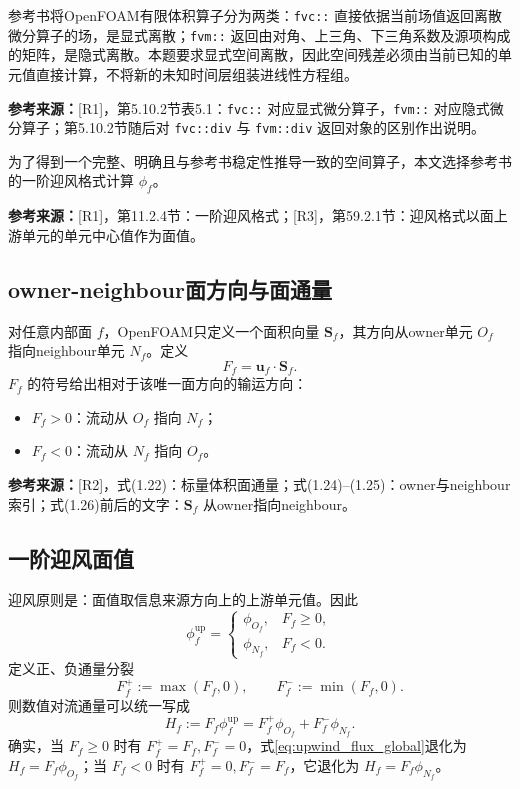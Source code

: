 \documentclass[UTF8,12pt,a4paper]{ctexart}
\numberwithin{equation}{section}
\newcommand{\Rone}{\textnormal{[R1]}}
\newcommand{\Rtwo}{\textnormal{[R2]}}
\newcommand{\Rthree}{\textnormal{[R3]}}
\newcommand{\source}[1]{%
  \par\smallskip
  \noindent\colorbox{sourcebg}{%
    \parbox{0.955\linewidth}{\footnotesize\color{sourcegray}\textbf{参考来源：}#1}%
  }
  \par\smallskip
}
\begin{document}
参考书将OpenFOAM有限体积算子分为两类：\texttt{fvc::} 直接依据当前场值返回离散微分算子的场，是显式离散；\texttt{fvm::} 返回由对角、上三角、下三角系数及源项构成的矩阵，是隐式离散。本题要求显式空间离散，因此空间残差必须由当前已知的单元值直接计算，不将新的未知时间层组装进线性方程组。

\source{\Rone，第5.10.2节表5.1：\texttt{fvc::} 对应显式微分算子，\texttt{fvm::} 对应隐式微分算子；第5.10.2节随后对 \texttt{fvc::div} 与 \texttt{fvm::div} 返回对象的区别作出说明。}

为了得到一个完整、明确且与参考书稳定性推导一致的空间算子，本文选择参考书的一阶迎风格式计算 $\phi_f$。

\source{\Rone，第11.2.4节：一阶迎风格式；\Rthree，第59.2.1节：迎风格式以面上游单元的单元中心值作为面值。}

\subsection{owner-neighbour面方向与面通量}

对任意内部面 $f$，OpenFOAM只定义一个面积向量 $\bm S_f$，其方向从owner单元 $O_f$ 指向neighbour单元 $N_f$。定义
\begin{equation}
  F_f=\bm u_f\cdot\bm S_f.
  \label{eq:global_face_flux}
\end{equation}
$F_f$ 的符号给出相对于该唯一面方向的输运方向：
\begin{itemize}
  \item $F_f>0$：流动从 $O_f$ 指向 $N_f$；
  \item $F_f<0$：流动从 $N_f$ 指向 $O_f$。
\end{itemize}

\source{\Rtwo，式(1.22)：标量体积面通量；式(1.24)--(1.25)：owner与neighbour索引；式(1.26)前后的文字：$\bm S_f$ 从owner指向neighbour。}

\subsection{一阶迎风面值}

迎风原则是：面值取信息来源方向上的上游单元值。因此
\begin{equation}
  \boxed{
  \phi_f^{\mathrm{up}}=
  \begin{cases}
    \phi_{O_f}, & F_f\ge0,\\[1mm]
    \phi_{N_f}, & F_f<0.
  \end{cases}
  }
  \label{eq:upwind_piecewise}
\end{equation}
定义正、负通量分裂
\begin{equation}
  F_f^+:=\max(F_f,0),
  \qquad
  F_f^-:=\min(F_f,0).
  \label{eq:flux_split}
\end{equation}
则数值对流通量可以统一写成
\begin{equation}
  \boxed{
  H_f:=F_f\phi_f^{\mathrm{up}}
  =F_f^+\phi_{O_f}+F_f^-\phi_{N_f}
  }.
  \label{eq:upwind_flux_global}
\end{equation}
确实，当 $F_f\ge0$ 时有 $F_f^+=F_f,F_f^-=0$，式\eqref{eq:upwind_flux_global}退化为 $H_f=F_f\phi_{O_f}$；当 $F_f<0$ 时有 $F_f^+=0,F_f^-=F_f$，它退化为 $H_f=F_f\phi_{N_f}$。
\end{document}
